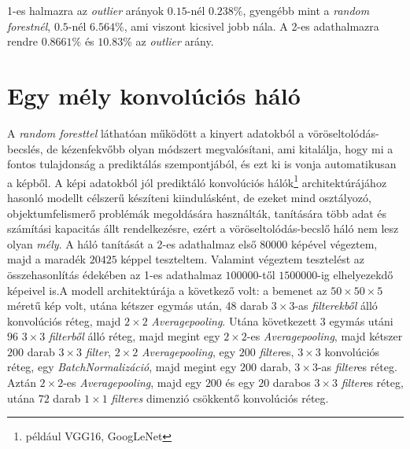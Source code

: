 \documentclass[12pt,letterpaper,twoside,openright]{book}
\begin{document}
1-es halmazra az \textit{outlier} arányok $0.15$-nél $0.238\%$, gyengébb mint a \textit{random forestnél}, $0.5$-nél $6.564\%$, ami viszont kicsivel jobb nála. A 2-es adathalmazra rendre $0.8661\%$ és $10.83\%$ az \textit{outlier} arány.
 
 \section{Egy mély konvolúciós háló}
 A \textit{random foresttel} láthatóan működött a kinyert adatokból a vöröseltolódás-becslés, de kézenfekvőbb olyan módszert megvalósítani, ami kitalálja, hogy mi a fontos tulajdonság a prediktálás szempontjából, és ezt ki is vonja automatikusan a képből.  
 \newline\indent
 A képi adatokból jól prediktáló konvolúciós hálók\footnote{például VGG16, GoogLeNet} architektúrájához hasonló modellt célszerű készíteni kiindulásként, de ezeket mind osztályozó, objektumfelismerő problémák megoldására használták, tanítására több adat és számítási kapacitás állt rendelkezésre, ezért a vöröseltolódás-becslő háló nem lesz olyan \textit{mély}. A háló tanítását a 2-es adathalmaz első $\num{80000}$ képével végeztem, majd a maradék $\num{20425}$ képpel teszteltem. Valamint végeztem tesztelést az összehasonlítás édekében az 1-es adathalmaz $\num{100000}$-től $1500000$-ig elhelyezekdő képeivel is.\newline\indent A modell architektúrája a következő volt: a bemenet az $50\times50\times5$ méretű kép volt, utána kétszer egymás után, 48 darab $3\times 3$-as \textit{filterekből} álló konvolúciós réteg, majd $2\times 2$ \textit{Averagepooling}. Utána következett 3 egymás utáni $96$ $3\times3$ \textit{filterből} álló réteg, majd megint egy $2\times2$-es \textit{Averagepooling}, majd kétszer $200$ darab $3\times3$ \textit{filter}, $2\times 2$ \textit{Averagepooling}, egy $200$ \textit{filter}es, $3\times 3$ konvolúciós réteg, egy \textit{BatchNormalizáció}, majd megint egy $200$ darab, $3\times 3$-as \textit{filter}es réteg. Aztán $2\times 2$-es \textit{Averagepooling}, majd egy $200$ és egy $20$ darabos $3\times 3$ \textit{filter}es réteg, utána $72$ darab $1\times 1$ \textit{filteres} dimenzió csökkentő konvolúciós réteg.
\end{document}
